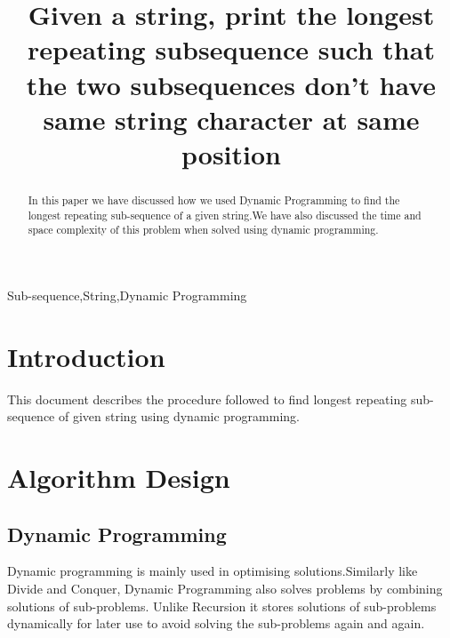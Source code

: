 \documentclass[conference]{IEEEtran}
\begin{document}
\title{Given a string, print the longest repeating subsequence such that the two subsequences don’t have same string character at same position\\

}

\author{
\and
{}
\and
{}

}

\maketitle

\begin{abstract}
In this paper we have discussed how we used Dynamic Programming to find the longest repeating sub-sequence of a given string.We have also discussed the time and space complexity of this problem when solved using dynamic programming.
\end{abstract}

\begin{IEEEkeywords}
Sub-sequence,String,Dynamic Programming
\end{IEEEkeywords}

\section{Introduction}
This document describes the procedure followed to find longest repeating sub-sequence of given string using dynamic programming.

\section{Algorithm Design}

\subsection{Dynamic Programming}

Dynamic programming is mainly used in optimising solutions.Similarly like Divide and Conquer, Dynamic Programming also solves problems by combining solutions of sub-problems. Unlike Recursion it stores solutions of sub-problems dynamically for later use to avoid solving the sub-problems again and again.
\end{document}
